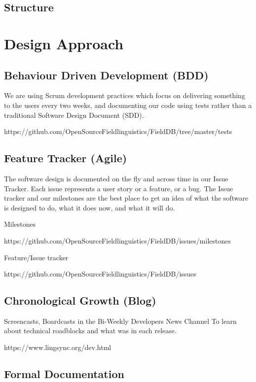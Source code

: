 \documentclass[12pt]{article}
\begin{document}
\subsection{Structure}


\section{Design Approach}

\subsection{Behaviour Driven Development (BDD)}

We are using Scrum development practices which focus on delivering something to the users every two weeks, and documenting our code using tests rather than a traditional Software Design Document (SDD).

https://github.com/OpenSourceFieldlinguistics/FieldDB/tree/master/tests

\subsection{Feature Tracker (Agile)}

The software design is documented on the fly and across time in our Issue Tracker. Each issue represents a user story or a feature, or a bug. The Issue tracker and our milestones are the best place to get an idea of what the software is designed to do, what it does now, and what it will do.

Milestones

https://github.com/OpenSourceFieldlinguistics/FieldDB/issues/milestones

Feature/Issue tracker

https://github.com/OpenSourceFieldlinguistics/FieldDB/issues

\subsection{Chronological Growth (Blog)}

Screencasts, Boardcasts in the Bi-Weekly Developers News Channel To learn about technical roadblocks and what was in each release.

https://www.lingsync.org/dev.html


\subsection{Formal Documentation}
\end{document}
